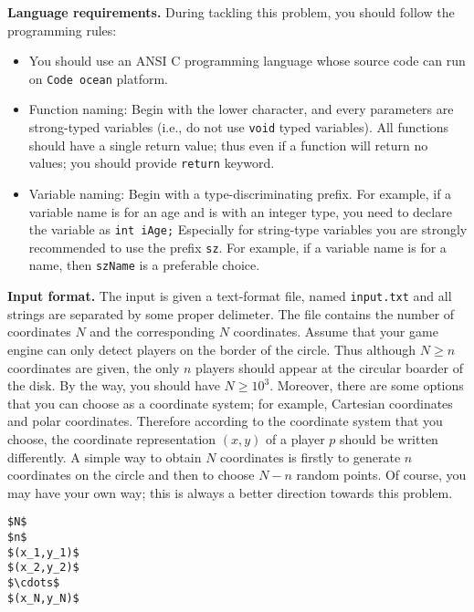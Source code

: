\documentclass{article}
\begin{document}
\bigskip
\noindent\textbf{Language requirements. }%
During tackling this problem, you should follow the programming rules:
\begin{itemize}
\item You should use an ANSI C programming language whose source code can run on \texttt{Code ocean} platform. 
\item Function naming: Begin with the lower character, and every parameters are strong-typed variables (i.e., do not use \texttt{void} typed variables).
	All functions should have a single return value; thus even if a function will return no values; you should provide \texttt{return} keyword.
\item Variable naming: Begin with a type-discriminating prefix. For example, if a variable name is for an age and is with an integer type,
	you need to declare the variable as \texttt{int iAge;}  Especially for string-type variables you are strongly recommended to use the prefix \texttt{sz}.
	For example, if a variable name is for a name, then \texttt{szName} is a preferable choice.
\end{itemize}


\bigskip
\noindent\textbf{Input format.} %
The input is given a text-format file, named \texttt{input.txt} and all strings are separated by some proper delimeter.
The file contains the number of coordinates  $N$ and the corresponding $N$ coordinates.
Assume that your game engine can only detect players on the border of the circle.
Thus although $N\geq n$ coordinates are given, the only $n$ players should appear at the circular boarder of the disk.
By the way, you should have $N\geq 10^3.$ 
Moreover, there are some options that you can choose as a coordinate system; for example, Cartesian coordinates and polar coordinates.
Therefore according to the coordinate system that you choose, the coordinate representation $(x,y)$ of a player $p$ 
should be written differently.
A simple way to obtain $N$ coordinates is firstly to generate $n$ coordinates on the circle and then to choose 
$N-n$ random points. Of course, you may have your own way; this is always a better direction towards this problem.

\begin{lstlisting}[backgroundcolor=\color{yellow!40}]
$N$
$n$
$(x_1,y_1)$
$(x_2,y_2)$
$\cdots$
$(x_N,y_N)$
\end{lstlisting}
\end{document}
